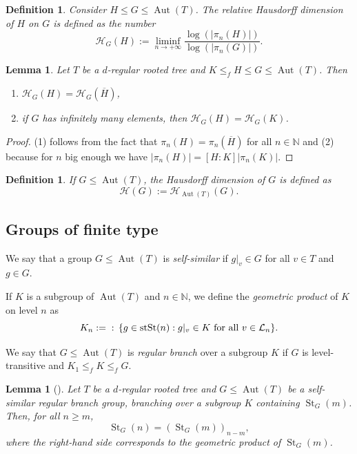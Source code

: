 \documentclass{amsart}
\def\set#1{{\def\st{\;:\;}\left\{#1\right\}}}
\def\abs#1{\left\vert{#1}\right\vert}
\def\NN{\mathbb N}
\DeclareMathOperator{\Aut}{Aut}
\DeclareMathOperator{\St}{St}
\DeclareMathOperator{\st}{st}
\newtheorem{Lemma}[Proposition]{Lemma}
\newtheorem{Definition}[Proposition]{Definition}
\begin{document}
\begin{Definition}
Consider $H \leq G \leq \Aut(T)$. The \textit{relative Hausdorff dimension} of $H$ on $G$ is defined as the number $$\mathcal{H}_G(H) := \liminf_{n \rightarrow +\infty} \frac{\log(\abs{\pi_n(H)})}{\log(\abs{\pi_n(G)})}.$$
\end{Definition}
\begin{Lemma}
Let $T$ be a $d$-regular rooted tree and $K \leq_f H \leq G \leq \Aut(T)$. Then
\begin{enumerate}
    \item $\mathcal{H}_G(H) = \mathcal{H}_G(\overline{H})$,
    \item if $G$ has infinitely many elements, then $\mathcal{H}_G(H) = \mathcal{H}_G(K)$.
\end{enumerate}
\label{lemma: Hausdorff dimension first properties}
\end{Lemma}

\begin{proof}
(1) follows from the fact that $\pi_n(H) = \pi_n(\overline{H})$ for all $n \in \NN$ and (2) because for $n$ big enough we have $\abs{\pi_n(H)} = [H:K] \abs{\pi_n(K)}$.
\end{proof}

\begin{Definition}
If $G \leq \Aut(T)$, the \textit{Hausdorff dimension} of $G$ is defined as $$\mathcal{H}(G) := \mathcal{H}_{\Aut(T)}(G).$$
\end{Definition}

\subsection{Groups of finite type}
\label{section: Groups of finite type}

We say that a group $G \leq \Aut(T)$ is \textit{self-similar} if $g|_v \in G$ for all $v \in T$ and $g \in G$. 

If $K$ is a subgroup of $\Aut(T)$ and $n \in \NN$, we define the \textit{geometric product} of $K$ on level $n$ as $$K_n := \set{g \in \St(n): g|_v \in K \text{ for all $v \in \mathcal{L}_n$}}.$$

We say that $G \leq \Aut(T)$ is \textit{regular branch} over a subgroup $K$ if $G$ is level-transitive and $K_1 \leq_f K \leq_f G$. 

\begin{Lemma}[{\cite[Lemma 10]{Sunic2006}}] 
Let $T$ be a $d$-regular rooted tree and $G \leq \Aut(T)$ be a self-similar regular branch group, branching over a subgroup $K$ containing $\St_G(m)$. Then, for all $n \geq m$, $$\St_G(n) = (\St_G(m))_{n-m},$$ where the right-hand side corresponds to the geometric product of $\St_G(m)$.
\label{lemma: St(n+1) = prod St(n)}
\end{Lemma}
\end{document}
